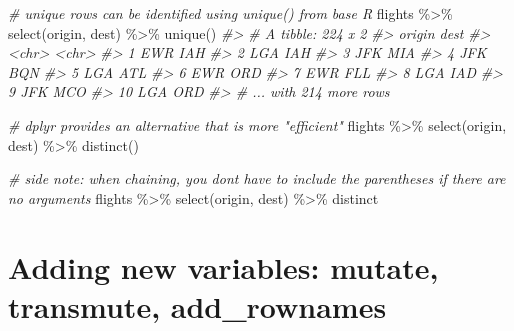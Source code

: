 \documentclass[
]{book}
\newenvironment{Shaded}{\begin{snugshade}}{\end{snugshade}}
\newcommand{\CommentTok}[1]{\textcolor[rgb]{0.56,0.35,0.01}{\textit{#1}}}
\newcommand{\FunctionTok}[1]{\textcolor[rgb]{0.00,0.00,0.00}{#1}}
\newcommand{\NormalTok}[1]{#1}
\newcommand{\SpecialCharTok}[1]{\textcolor[rgb]{0.00,0.00,0.00}{#1}}
\begin{document}
\begin{Shaded}
\begin{Highlighting}[]
\CommentTok{\# unique rows can be identified using unique() from base R}
\NormalTok{flights }\SpecialCharTok{\%\textgreater{}\%} \FunctionTok{select}\NormalTok{(origin, dest) }\SpecialCharTok{\%\textgreater{}\%} \FunctionTok{unique}\NormalTok{()}
\CommentTok{\#\textgreater{} \# A tibble: 224 x 2}
\CommentTok{\#\textgreater{}    origin dest }
\CommentTok{\#\textgreater{}    \textless{}chr\textgreater{}  \textless{}chr\textgreater{}}
\CommentTok{\#\textgreater{}  1 EWR    IAH  }
\CommentTok{\#\textgreater{}  2 LGA    IAH  }
\CommentTok{\#\textgreater{}  3 JFK    MIA  }
\CommentTok{\#\textgreater{}  4 JFK    BQN  }
\CommentTok{\#\textgreater{}  5 LGA    ATL  }
\CommentTok{\#\textgreater{}  6 EWR    ORD  }
\CommentTok{\#\textgreater{}  7 EWR    FLL  }
\CommentTok{\#\textgreater{}  8 LGA    IAD  }
\CommentTok{\#\textgreater{}  9 JFK    MCO  }
\CommentTok{\#\textgreater{} 10 LGA    ORD  }
\CommentTok{\#\textgreater{} \# ... with 214 more rows}
\end{Highlighting}
\end{Shaded}

\begin{Shaded}
\begin{Highlighting}[]
\CommentTok{\# dplyr provides an alternative that is more "efficient"}
\NormalTok{flights }\SpecialCharTok{\%\textgreater{}\%} \FunctionTok{select}\NormalTok{(origin, dest) }\SpecialCharTok{\%\textgreater{}\%} \FunctionTok{distinct}\NormalTok{()}

\CommentTok{\# side note: when chaining, you don\textquotesingle{}t have to include the parentheses if there are no arguments}
\NormalTok{flights }\SpecialCharTok{\%\textgreater{}\%} \FunctionTok{select}\NormalTok{(origin, dest) }\SpecialCharTok{\%\textgreater{}\%}\NormalTok{ distinct}
\end{Highlighting}
\end{Shaded}

\hypertarget{adding-new-variables-mutate-transmute-add_rownames}{%
\section{Adding new variables: mutate, transmute, add\_rownames}\label{adding-new-variables-mutate-transmute-add_rownames}}
\end{document}
